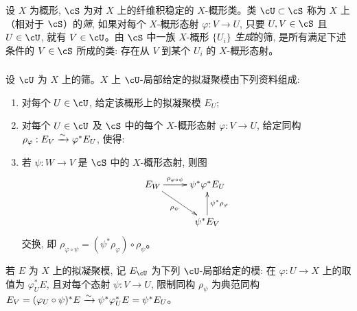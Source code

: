 \subsubsection{}\label{I:1-4-3}

设 $X$ 为概形, $\cS$ 为对 $X$ 上的纤维积稳定的 $X$-概形类。类 $\cU\subset\cS$ 称为 $X$ 上（相对于 $\cS$）的\emph{筛}, 如果对每个 $X$-概形态射 $\varphi:V\to U$, 只要 $U,V\in\cS$ 且 $U\in\cU$, 就有 $V\in\cU$。由 $\cS$ 中一族 $X$-概形 $\{U_i\}$ \emph{生成}的筛, 是所有满足下述条件的 $V\in\cS$ 所成的类: 存在从 $V$ 到某个 $U_i$ 的 $X$-概形态射。

\subsubsection{}\label{I:1-4-4}

设 $\cU$ 为 $X$ 上的筛。$X$ 上 $\cU$-局部给定的拟凝聚模由下列资料组成:
\begin{enumerate}[\indent a)]
  \item 对每个 $U\in\cU$, 给定该概形上的拟凝聚模 $E_U$;
  \item 对每个 $U\in\cU$ 及 $\cS$ 中的每个 $X$-概形态射 $\varphi:V\to U$, 给定同构
    $\rho_\varphi:E_V\xrightarrow\sim\varphi^*E_U$, 使得:
  \item 若 $\psi:W\to V$ 是 $\cS$ 中的 $X$-概形态射, 则图
    \[\xymatrix{
      E_W \ar[r]^-{\rho_{\varphi\circ\psi}} \ar[dr]_-{\rho_\psi}
        & \psi^*\varphi^* E_U \\
      & \psi^* E_V \ar[u]_-{\psi^*\rho_\varphi}
    }\]
    交换, 即
    $\rho_{\varphi\circ\psi}=(\psi^*\rho_\varphi)\circ\rho_\psi$。
\end{enumerate}

若 $E$ 为 $X$ 上的拟凝聚模, 记 $E_\cU$ 为下列 $\cU$-局部给定的模: 在 $\varphi:U\to X$ 上的取值为 $\varphi_U^*E$, 且对每个态射 $\psi:V\to U$, 限制同构 $\rho_\psi$ 为典范同构 $E_V=(\varphi_U\circ\psi)^*E\xrightarrow\sim\psi^*\varphi_U^*E=\psi^*E_U$。

